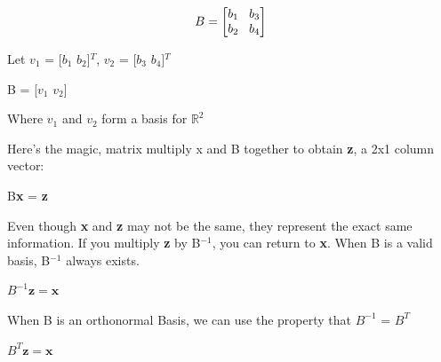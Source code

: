 \documentclass[11pt]{article}
\begin{document}
\vspace{5mm}

\begin{center}
\[
B = 
\begin{bmatrix}
   b_1  \hspace{3mm}   b_3 \\
   b_2 \hspace{3mm}   b_4            
\end{bmatrix}
\]
\end{center}

Let $v_1$ = [$b_1$ $b_2$]$^T$, $v_2$ = [$b_3$ $b_4$]$^T$

\vspace{4mm}
\begin{center}
B =  [\textbf{$v_1$} \textbf{$v_2$}] 

\end{center}



Where $v_1$ and $v_2$ form a basis for $\mathbb{R}^2$
\vspace{4mm}

Here's the magic, matrix multiply x and B together to obtain \textbf{z}, a 2x1 column vector:
\vspace{2mm}
\begin{center}

B\textbf{x} = \textbf{z}
\end{center}

\vspace{4mm}

Even though \textbf{x} and \textbf{z} may not be the same, they represent the exact same information. If you multiply \textbf{z} by B$^{-1}$, you can return to \textbf{x}. When B is a valid basis, B$^{-1}$ always exists.

\begin{center}

$B^{-1} \textbf{z} = \textbf{x}$

\end{center}

\vspace{4mm}

When B is an orthonormal Basis, we can use the property that $B^{-1}$ = $B^T$

\begin{center}

$B^{T} \textbf{z} = \textbf{x}$

\end{center}

\newpage
\end{document}
